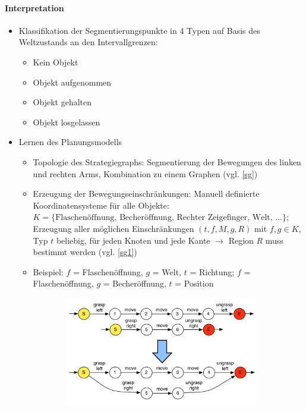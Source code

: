 \paragraph*{Interpretation} 
\begin{itemize}
\item Klassifikation der Segmentierungspunkte in 4 Typen auf Basis des Weltzustands an den Intervallgrenzen: 
\begin{itemize}
\item Kein Objekt
\item Objekt aufgenommen
\item Objekt gehalten
\item Objekt losgelassen
\end{itemize}
\item Lernen des Planungsmodells
\begin{itemize}
\item  Topologie des Strategiegraphs: Segmentierung der Bewegungen des linken und rechten Arms, Kombination zu einem Graphen (vgl. \autoref{sg})
\item Erzeugung der Bewegungseinschränkungen: Manuell definierte Koordinatensysteme für alle Objekte: $K = \{ \text{Flaschenöffnung, Becheröffnung,
Rechter Zeigefinger, Welt, ...} \}$; Erzeugung aller möglichen Einschränkungen $(t, f, M, g, R)$ mit $f,g \in K$, Typ $t$ beliebig,
für jeden Knoten und jede Kante $\rightarrow$ Region $R$ muss bestimmt werden (vgl. \autoref{sg1})
\item Beispiel: $f$ = Flaschenöffnung, $g$ = Welt, $t$ = Richtung; $f$ = Flaschenöffnung, $g$ = Becheröffnung, $t$ = Position
\end{itemize}
\begin{figure}[h!]
	\centering
	\begin{subfigure}{.4\textwidth}
		\includegraphics[width=\textwidth]{figures/ch03_stratgraph.png}

\end{subfigure}
\end{figure}
\end{itemize}
